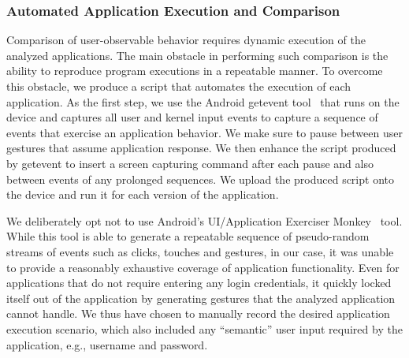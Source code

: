 \subsubsection{Automated Application Execution and Comparison}
Comparison of user-observable behavior requires dynamic execution of the analyzed applications. 
The main obstacle in performing such comparison is the ability to reproduce program executions in a repeatable manner. 
To overcome this obstacle, we produce a script that automates the execution of each application.
As the first step, we use the Android getevent tool~\cite{getevent} that runs on the device and captures all user and kernel input events to capture a sequence of events that exercise an application behavior. We make sure to pause between user gestures that assume application response. 
We then enhance the script produced by getevent to insert a screen capturing command after each pause and also between events of any prolonged sequences. 
We upload the produced script onto the device and run it for each version of the application. 

We deliberately opt not to use Android's UI/Application Exerciser Monkey~\cite{monkey} tool. While this tool is able to  
generate a repeatable sequence of pseudo-random streams of events such as clicks, touches and gestures, in our case, 
it was unable to provide a reasonably exhaustive
coverage of application functionality. Even for applications that do not require entering any login credentials, it quickly locked itself out of the application by generating gestures that the analyzed application cannot handle. 
We thus have chosen to manually record the desired application execution scenario, which also included any ``semantic'' user input required by the application, e.g., username and password. 

